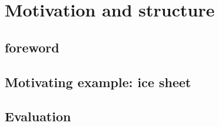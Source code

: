 \section{Motivation and structure}

\subsection{foreword}


\subsection{Motivating example: ice sheet}


\subsection{Evaluation}


